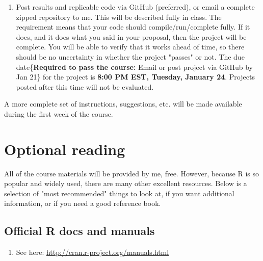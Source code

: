 \documentclass{tufte-handout}
\begin{document}
\begin{description}
\begin{enumerate}
\begin{itemize}
\begin{itemize}
\end{itemize}
\end{itemize}
\item Post results and replicable code via GitHub (preferred), or email a complete zipped repository to me. This will be described fully in class. The requirement means that your code should compile/run/complete fully. If it does, and it does what you said in your proposal, then the project will be complete.  You will be able to verify that it works ahead of time, so there should be no uncertainty in whether the project "passes" or not. The due date\marginnote\{\textbf{Required to pass the course:} Email or post project via GitHub by Jan 21\} for the project is \textbf{8:00 PM EST, Tuesday, January 24}. Projects posted after this time will not be evaluated.
\end{enumerate}
\end{description}

A more complete set of instructions, suggestions, etc. will be made available during the first week of the course.
\section*{Optional reading}
\label{sec:orgheadline15}
All of the course materials will be provided by me, free. However, because R is so popular and widely used, there are many other excellent resources.  Below is a selection of "most recommended" things to look at, if you want additional information, or if you need a good reference book.

\newpage
\subsection*{Official R docs and manuals}
\label{sec:orgheadline11}
\begin{enumerate}
\item See here: \url{http://cran.r-project.org/manuals.html}
\end{enumerate}
\end{document}
